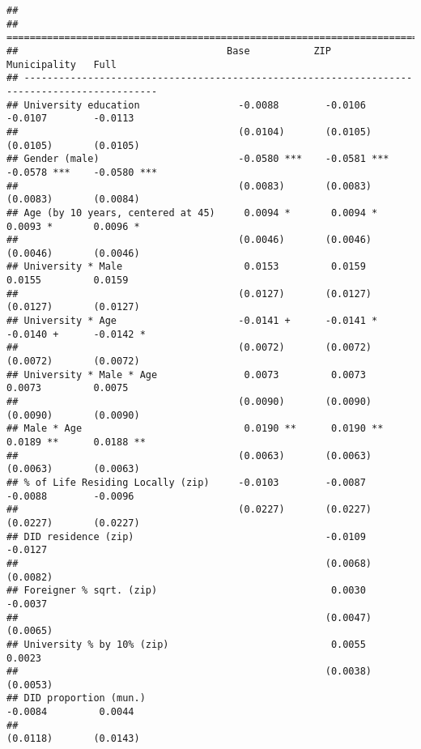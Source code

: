 \documentclass[
]{article}
\begin{document}
\begin{verbatim}
## 
## =============================================================================================
##                                    Base           ZIP            Municipality   Full         
## ---------------------------------------------------------------------------------------------
## University education                 -0.0088        -0.0106        -0.0107        -0.0113    
##                                      (0.0104)       (0.0105)       (0.0105)       (0.0105)   
## Gender (male)                        -0.0580 ***    -0.0581 ***    -0.0578 ***    -0.0580 ***
##                                      (0.0083)       (0.0083)       (0.0083)       (0.0084)   
## Age (by 10 years, centered at 45)     0.0094 *       0.0094 *       0.0093 *       0.0096 *  
##                                      (0.0046)       (0.0046)       (0.0046)       (0.0046)   
## University * Male                     0.0153         0.0159         0.0155         0.0159    
##                                      (0.0127)       (0.0127)       (0.0127)       (0.0127)   
## University * Age                     -0.0141 +      -0.0141 *      -0.0140 +      -0.0142 *  
##                                      (0.0072)       (0.0072)       (0.0072)       (0.0072)   
## University * Male * Age               0.0073         0.0073         0.0073         0.0075    
##                                      (0.0090)       (0.0090)       (0.0090)       (0.0090)   
## Male * Age                            0.0190 **      0.0190 **      0.0189 **      0.0188 ** 
##                                      (0.0063)       (0.0063)       (0.0063)       (0.0063)   
## % of Life Residing Locally (zip)     -0.0103        -0.0087        -0.0088        -0.0096    
##                                      (0.0227)       (0.0227)       (0.0227)       (0.0227)   
## DID residence (zip)                                 -0.0109                       -0.0127    
##                                                     (0.0068)                      (0.0082)   
## Foreigner % sqrt. (zip)                              0.0030                       -0.0037    
##                                                     (0.0047)                      (0.0065)   
## University % by 10% (zip)                            0.0055                        0.0023    
##                                                     (0.0038)                      (0.0053)   
## DID proportion (mun.)                                              -0.0084         0.0044    
##                                                                    (0.0118)       (0.0143)   

\end{verbatim}
\end{document}
